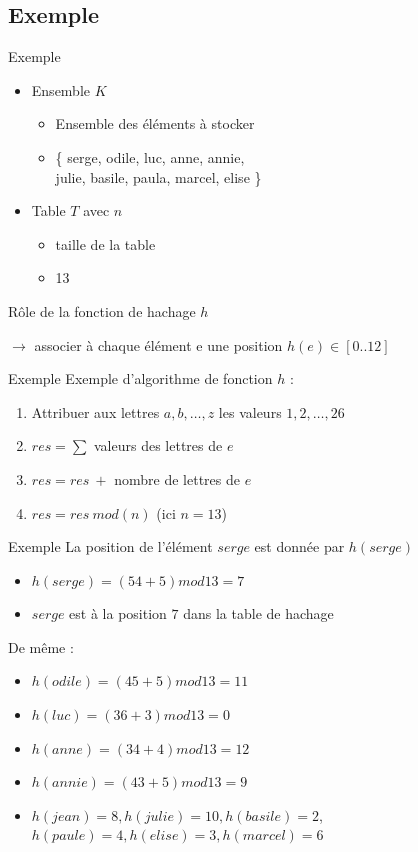 \documentclass{beamer}
\begin{document}
  \subsection{Exemple}
  \begin{frame}{Exemple}
    \begin{itemize}
      \item{Ensemble $K$}
      \begin{itemize}
        \item{Ensemble des éléments à stocker}
        \item{\{ serge, odile, luc, anne, annie,\\
        julie, basile, paula, marcel, elise \}}
      \end{itemize}
      \item{Table $T$ avec $n$}
      \begin{itemize}
        \item{taille de la table}
        \item{13}
      \end{itemize}
    \end{itemize}

    Rôle de la fonction de hachage $h$

    $\rightarrow$ associer à chaque élément e une position $h(e) \in [0..12]$
  \end{frame}

  \begin{frame}{Exemple}
    Exemple d’algorithme de fonction $h$ :
    \begin{enumerate}
      \item{Attribuer aux lettres $a,b,\ldots,z$ les valeurs $1,2,\ldots,26$}
      \item{$res = \sum$ valeurs des lettres de $e$}
      \item{$res = res\ +$ nombre de lettres de $e$}
      \item{$res = res\ mod(n)$ (ici $n = 13$)}
    \end{enumerate}
  \end{frame}
  \begin{frame}{Exemple}
    La position de l’élément $serge$ est donnée par $h(serge)$
    \begin{itemize}
      \item{$h(serge) = (54 + 5)mod13 = 7$}
      \item{$serge$ est à la position $7$ dans la table de hachage}
    \end{itemize}

    De même :
    \begin{itemize}
      \item{$h(odile) = (45 + 5)mod13 = 11$}
      \item{$h(luc) = (36 + 3)mod13 = 0$}
      \item{$h(anne) = (34 + 4)mod13 = 12$}
      \item{$h(annie) = (43 + 5)mod13 = 9$}
      \item{$h(jean) = 8, h(julie) = 10, h(basile) = 2$,\\
      $h(paule) = 4, h(elise) = 3, h(marcel) = 6$}
    \end{itemize}
  \end{frame}
\end{document}
